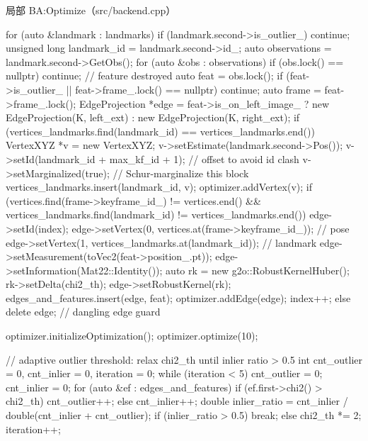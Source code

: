 \begin{codebox}[C++]{局部 BA:Optimize（src/backend.cpp）}
{    for (auto &landmark : landmarks) {
        if (landmark.second->is_outlier_) continue;
        unsigned long landmark_id = landmark.second->id_;
        auto observations = landmark.second->GetObs();
        for (auto &obs : observations) {
            if (obs.lock() == nullptr) continue;            // feature destroyed
            auto feat = obs.lock();
            if (feat->is_outlier_ || feat->frame_.lock() == nullptr) continue;
            auto frame = feat->frame_.lock();
            EdgeProjection *edge = feat->is_on_left_image_
                ? new EdgeProjection(K, left_ext)
                : new EdgeProjection(K, right_ext);
            if (vertices_landmarks.find(landmark_id) == vertices_landmarks.end()) {
                VertexXYZ *v = new VertexXYZ;
                v->setEstimate(landmark.second->Pos());
                v->setId(landmark_id + max_kf_id + 1);      // offset to avoid id clash
                v->setMarginalized(true);                   // Schur-marginalize this block
                vertices_landmarks.insert({landmark_id, v});
                optimizer.addVertex(v);
            }
            if (vertices.find(frame->keyframe_id_) != vertices.end() &&
                vertices_landmarks.find(landmark_id) != vertices_landmarks.end()) {
                edge->setId(index);
                edge->setVertex(0, vertices.at(frame->keyframe_id_));      // pose
                edge->setVertex(1, vertices_landmarks.at(landmark_id));    // landmark
                edge->setMeasurement(toVec2(feat->position_.pt));
                edge->setInformation(Mat22::Identity());
                auto rk = new g2o::RobustKernelHuber();
                rk->setDelta(chi2_th);
                edge->setRobustKernel(rk);
                edges_and_features.insert({edge, feat});
                optimizer.addEdge(edge);
                index++;
            } else {
                delete edge;                                // dangling edge guard
            }
        }
    }

    optimizer.initializeOptimization();
    optimizer.optimize(10);

    // adaptive outlier threshold: relax chi2_th until inlier ratio > 0.5
    int cnt_outlier = 0, cnt_inlier = 0, iteration = 0;
    while (iteration < 5) {
        cnt_outlier = 0; cnt_inlier = 0;
        for (auto &ef : edges_and_features) {
            if (ef.first->chi2() > chi2_th) cnt_outlier++; else cnt_inlier++;
        }
        double inlier_ratio = cnt_inlier / double(cnt_inlier + cnt_outlier);
        if (inlier_ratio > 0.5) break;
        else { chi2_th *= 2; iteration++; }
    }

}
\end{codebox}
